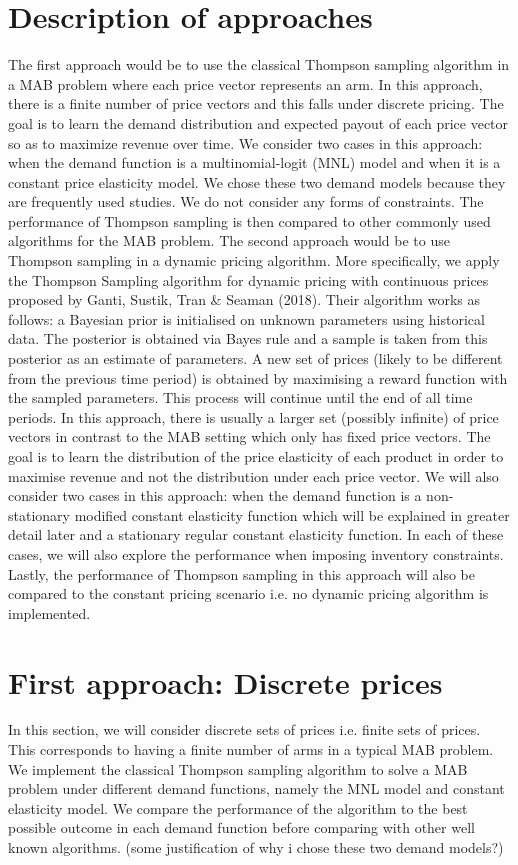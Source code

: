 \documentclass[a4paper]{article}
\begin{document}
\section{Description of approaches}
\label{sec:approach}
The first approach would be to use the classical Thompson sampling algorithm in a MAB problem where each price vector represents an arm. In this approach, there is a finite number of price vectors and this falls under discrete pricing. The goal is to learn the demand distribution and expected payout of each price vector so as to maximize revenue over time. We consider two cases in this approach: when the demand function is a multinomial-logit (MNL) model and when it is a constant price elasticity model. We chose these two demand models because they are frequently used studies. We do not consider any forms of constraints. The performance of Thompson sampling is then compared to other commonly used algorithms for the MAB problem.
\newline
\newline
The second approach would be to use Thompson sampling in a dynamic pricing algorithm. More specifically, we apply the Thompson Sampling algorithm for dynamic pricing with continuous prices proposed by Ganti, Sustik, Tran \& Seaman (2018). Their algorithm works as follows: a Bayesian prior is initialised on unknown parameters using historical data. The posterior is obtained via Bayes rule and a sample is taken from this posterior as an estimate of parameters. A new set of prices (likely to be different from the previous time period) is obtained by maximising a reward function with the sampled parameters. This process will continue until the end of all time periods. In this approach, there is usually a larger set (possibly infinite) of price vectors in contrast to the MAB setting which only has fixed price vectors. The goal is to learn the distribution of the price elasticity of each product in order to maximise revenue and not the distribution under each price vector. We will also consider two cases in this approach: when the demand function is a non-stationary modified constant elasticity function which will be explained in greater detail later and a stationary regular constant elasticity function. In each of these cases, we will also explore the performance when imposing inventory constraints. Lastly, the performance of Thompson sampling in this approach will also be compared to the constant pricing scenario i.e. no dynamic pricing algorithm is implemented.

\section{First approach: Discrete prices}
In this section, we will consider discrete sets of prices i.e. finite sets of prices. This corresponds to having a finite number of arms in a typical MAB problem. We implement the classical Thompson sampling algorithm to solve a MAB problem under different demand functions, namely the MNL model and constant elasticity model. We compare the performance of the algorithm to the best possible outcome in each demand function before comparing with other well known algorithms.
(some justification of why i chose these two demand models?)
\end{document}

